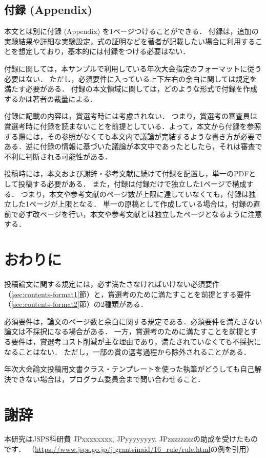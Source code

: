 \documentclass[
  platex, dvipdfmx,  %
]{nlp2026}
\begin{document}
\subsection{付録 (Appendix)}
\label{sec:appendix}
本文とは別に付録 (Appendix) を1ページつけることができる．
付録は，追加の実験結果や詳細な実験設定，式の証明などを著者が記載したい場合に利用することを想定しており，基本的には付録をつける必要はない．

付録に関しては，本サンプルで利用している年次大会指定のフォーマットに従う必要はない．
ただし，必須要件に入っている上下左右の余白に関しては規定を満たす必要がある．
付録の本文領域に関しては，どのような形式で付録を作成するかは著者の裁量による．

付録に記載の内容は，賞選考時には考慮されない．
つまり，賞選考の審査員は賞選考時に付録を読まないことを前提としている．よって，本文から付録を参照する際には，その参照がなくても本文内で議論が完結するような書き方が必要である．逆に付録の情報に基づいた議論が本文中であったとしたら，それは審査で不利に判断される可能性がある．



投稿時には，本文および謝辞・参考文献に続けて付録を配置し，単一のPDFとして投稿する必要がある．
また，付録は付録だけで独立した1ページで構成する．
つまり，本文や参考文献のページ数が上限に達していなくても，付録は独立した1ページが上限となる．
単一の原稿として作成している場合は，付録の直前で必ず改ページを行い，本文や参考文献とは独立したページとなるように注意する．


\section{おわりに}
投稿論文に関する規定には，必ず満たさなければいけない必須要件（\ref{sec:contents-format1}節）と，賞選考のために満たすことを前提とする要件（\ref{sec:contents-format2}節）の2種類がある．

必須要件は，論文のページ数と余白に関する規定である．必須要件を満たさない論文は不採択になる場合がある．
一方，賞選考のために満たすことを前提とする要件は，賞選考コスト削減が主な理由であり，満たされていなくても不採択になることはない．
ただし，一部の賞の選考過程から除外されることがある．

年次大会論文投稿用文書クラス・テンプレートを使った執筆がどうしても自己解決できない場合は，プログラム委員会まで問い合わせること．





\newpage
\section*{謝辞}
本研究はJSPS科研費 JPxxxxxxxx, JPyyyyyyyy, JPzzzzzzzzの助成を受けたものです．
（\url{https://www.jsps.go.jp/j-grantsinaid/16_rule/rule.html}の例を引用）
\end{document}
